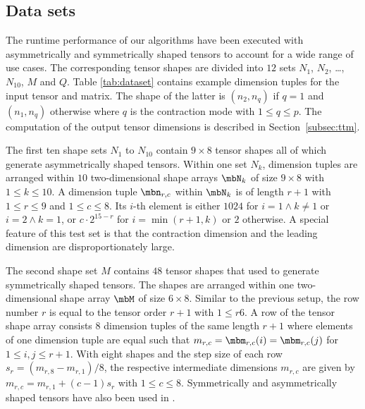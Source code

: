  
\subsection{Data sets} 
The runtime performance of our algorithms have been executed with asymmetrically and symmetrically shaped tensors to account for a wide range of use cases.
The corresponding tensor shapes are divided into $12$ sets $N_1$, $N_2$, \dots, $N_{10}$, $M$ and $Q$.
Table \ref{tab:dataset} contains example dimension tuples for the input tensor and matrix.
The shape of the latter is $(n_2,n_q)$ if $q=1$ and $(n_1,n_q)$ otherwise where $q$ is the contraction mode with $1 \leq q \leq p$.
The computation of the output tensor dimensions is described in Section~\ref{subsec:ttm}.

The first ten shape sets $N_1$ to $N_{10}$ contain $9 \times 8$ tensor shapes all of which generate asymmetrically shaped tensors.
Within one set $N_k$, dimension tuples are arranged within $10$ two-dimensional shape arrays $\mbN_k$ of size $9 \times 8$ with $1 \leq k \leq 10$.
A dimension tuple $\mbn_{r,c}$ within $\mbN_k$ is of length $r+1$ with $1 \leq r \leq 9$ and $1 \leq c \leq 8$.
Its $i$-th element is either $1024$ for $i = 1 \wedge k \neq 1$ or $i = 2 \wedge k = 1$, or $c \cdot 2^{15-r}$ for $i = \min(r+1,k)$ or $2$ otherwise.
A special feature of this test set is that the contraction dimension and the leading dimension are disproportionately large.

The second shape set $M$ contains $48$ tensor shapes that used to generate symmetrically shaped tensors.
The shapes are arranged within one two-dimensional shape array $\mbM$ of size $6 \times 8$.
Similar to the previous setup, the row number $r$ is equal to the tensor order $r+1$ with $1 \leq r 6$.
A row of the tensor shape array consists $8$ dimension tuples of the same length $r+1$ where elements of one dimension tuple are equal such that $m_{r,c} = \mbm_{r,c}(i) = \mbm_{r,c}(j)$ for $1 \leq i,j \leq r+1$.
With eight shapes and the step size of each row $s_r = (m_{r,8}-m_{r,1})/8$, the respective intermediate dimensions $m_{r,c}$ are given by $m_{r,c} = m_{r,1} + (c-1) s_r$ with $1 \leq c \leq 8$.
Symmetrically and asymmetrically shaped tensors have also been used in \cite{bassoy:2019:ttv, bassoy:2018:fast}.

